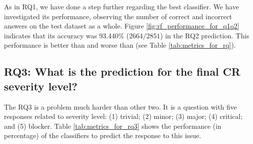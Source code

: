 \documentclass[10pt, conference]{IEEEtran}
\begin{document}
As in RQ1, we have done a step further regarding the best classifier. We have investigated its performance, observing the number of correct and incorrect answers on the test dataset as a whole. Figure \ref{fig:rf_performance_for_q1q2} indicates that its accuracy was 93.440\% ($ 2664 / 2851$) in the RQ2 prediction. This performance is better than \cite{Tian2012} and worse than \cite{Menzies2008} (see Table \ref{tab:metrics_for_rq}).


\subsection{RQ3: What is the prediction for the final CR severity level?}

The RQ3 is a problem much harder than other two. It is a question with five responses related to severity level: (1) trivial; (2) minor; (3) major; (4) critical; and (5) blocker. Table \ref{tab:metrics_for_rq3} shows the performance (in percentage) of the classifiers to predict the response to this issue.
\end{document}
